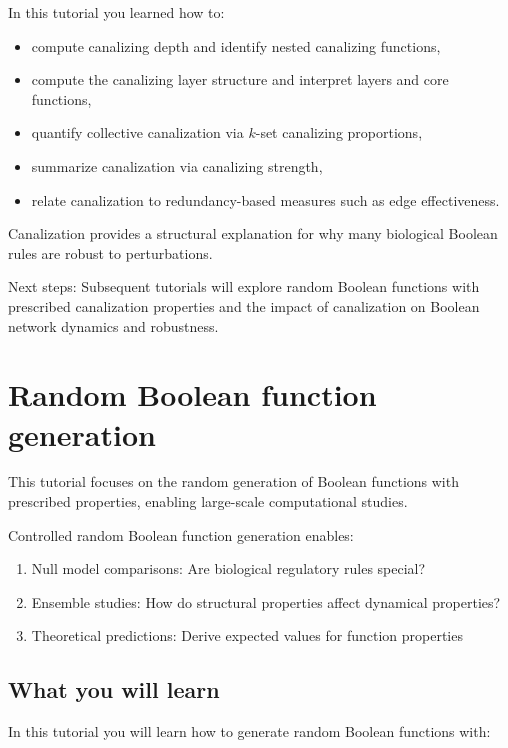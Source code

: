 \documentclass[
]{article}
\providecommand{\tightlist}{%
  \setlength{\itemsep}{0pt}\setlength{\parskip}{0pt}}
\begin{document}
In this tutorial you learned how to:

\begin{itemize}
\tightlist
\item
  compute canalizing depth and identify nested canalizing functions,
\item
  compute the canalizing layer structure and interpret layers and core
  functions,
\item
  quantify collective canalization via \(k\)-set canalizing proportions,
\item
  summarize canalization via canalizing strength,
\item
  relate canalization to redundancy-based measures such as edge
  effectiveness.
\end{itemize}

Canalization provides a structural explanation for why many biological
Boolean rules are robust to perturbations.

Next steps: Subsequent tutorials will explore random Boolean functions
with prescribed canalization properties and the impact of canalization
on Boolean network dynamics and robustness.

\section{Random Boolean function
generation}\label{random-boolean-function-generation}

This tutorial focuses on the random generation of Boolean functions with
prescribed properties, enabling large-scale computational studies.

Controlled random Boolean function generation enables:

\begin{enumerate}
\def\labelenumi{\arabic{enumi}.}
\tightlist
\item
  Null model comparisons: Are biological regulatory rules special?
\item
  Ensemble studies: How do structural properties affect dynamical
  properties?
\item
  Theoretical predictions: Derive expected values for function
  properties
\end{enumerate}

\subsection{What you will learn}\label{what-you-will-learn-3}

In this tutorial you will learn how to generate random Boolean functions
with:
\end{document}
